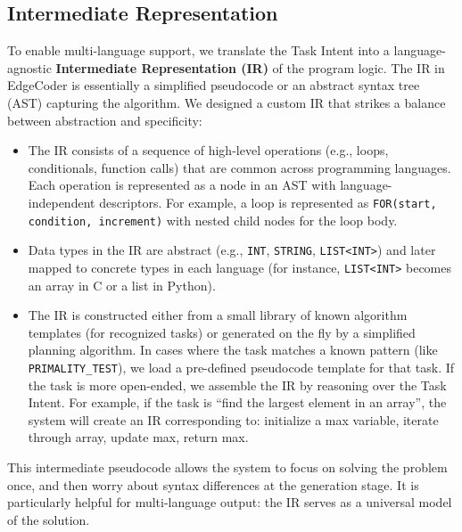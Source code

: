 \documentclass[12pt]{article}
\begin{document}
\subsection{Intermediate Representation}
To enable multi-language support, we translate the Task Intent into a language-agnostic \textbf{Intermediate Representation (IR)} of the program logic. The IR in EdgeCoder is essentially a simplified pseudocode or an abstract syntax tree (AST) capturing the algorithm. We designed a custom IR that strikes a balance between abstraction and specificity:
\begin{itemize}
    \item The IR consists of a sequence of high-level operations (e.g., loops, conditionals, function calls) that are common across programming languages. Each operation is represented as a node in an AST with language-independent descriptors. For example, a loop is represented as \texttt{FOR(start, condition, increment)} with nested child nodes for the loop body.
    \item Data types in the IR are abstract (e.g., \texttt{INT}, \texttt{STRING}, \texttt{LIST<INT>}) and later mapped to concrete types in each language (for instance, \texttt{LIST<INT>} becomes an array in C or a list in Python).
    \item The IR is constructed either from a small library of known algorithm templates (for recognized tasks) or generated on the fly by a simplified planning algorithm. In cases where the task matches a known pattern (like \texttt{PRIMALITY\_TEST}), we load a pre-defined pseudocode template for that task. If the task is more open-ended, we assemble the IR by reasoning over the Task Intent. For example, if the task is “find the largest element in an array”, the system will create an IR corresponding to: initialize a max variable, iterate through array, update max, return max.
\end{itemize}
This intermediate pseudocode allows the system to focus on solving the problem once, and then worry about syntax differences at the generation stage. It is particularly helpful for multi-language output: the IR serves as a universal model of the solution.
\end{document}
